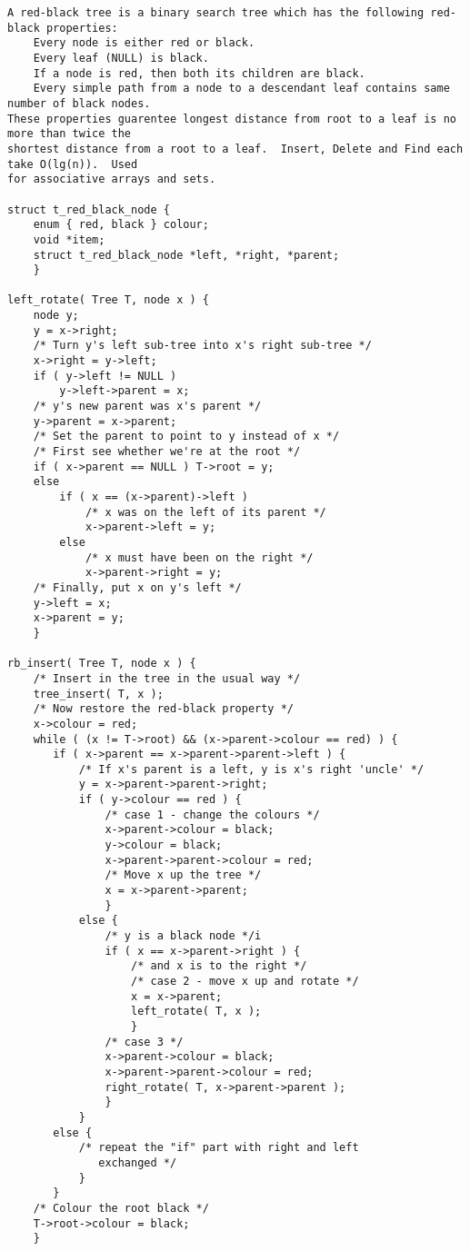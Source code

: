 \begin{verbatim}
A red-black tree is a binary search tree which has the following red-black properties: 
    Every node is either red or black. 
    Every leaf (NULL) is black. 
    If a node is red, then both its children are black. 
    Every simple path from a node to a descendant leaf contains same number of black nodes.  
These properties guarentee longest distance from root to a leaf is no more than twice the
shortest distance from a root to a leaf.  Insert, Delete and Find each take O(lg(n)).  Used
for associative arrays and sets.

struct t_red_black_node {
    enum { red, black } colour;
    void *item;
    struct t_red_black_node *left, *right, *parent;
    }

left_rotate( Tree T, node x ) {
    node y;
    y = x->right;
    /* Turn y's left sub-tree into x's right sub-tree */
    x->right = y->left;
    if ( y->left != NULL )
        y->left->parent = x;
    /* y's new parent was x's parent */
    y->parent = x->parent;
    /* Set the parent to point to y instead of x */
    /* First see whether we're at the root */
    if ( x->parent == NULL ) T->root = y;
    else
        if ( x == (x->parent)->left )
            /* x was on the left of its parent */
            x->parent->left = y;
        else
            /* x must have been on the right */
            x->parent->right = y;
    /* Finally, put x on y's left */
    y->left = x;
    x->parent = y;
    }

rb_insert( Tree T, node x ) {
    /* Insert in the tree in the usual way */
    tree_insert( T, x );
    /* Now restore the red-black property */
    x->colour = red;
    while ( (x != T->root) && (x->parent->colour == red) ) {
       if ( x->parent == x->parent->parent->left ) {
           /* If x's parent is a left, y is x's right 'uncle' */
           y = x->parent->parent->right;
           if ( y->colour == red ) {
               /* case 1 - change the colours */
               x->parent->colour = black;
               y->colour = black;
               x->parent->parent->colour = red;
               /* Move x up the tree */
               x = x->parent->parent;
               }
           else {
               /* y is a black node */i
               if ( x == x->parent->right ) {
                   /* and x is to the right */ 
                   /* case 2 - move x up and rotate */
                   x = x->parent;
                   left_rotate( T, x );
                   }
               /* case 3 */
               x->parent->colour = black;
               x->parent->parent->colour = red;
               right_rotate( T, x->parent->parent );
               }
           }
       else {
           /* repeat the "if" part with right and left
              exchanged */
           }
       }
    /* Colour the root black */
    T->root->colour = black;
    }

\end{verbatim}
